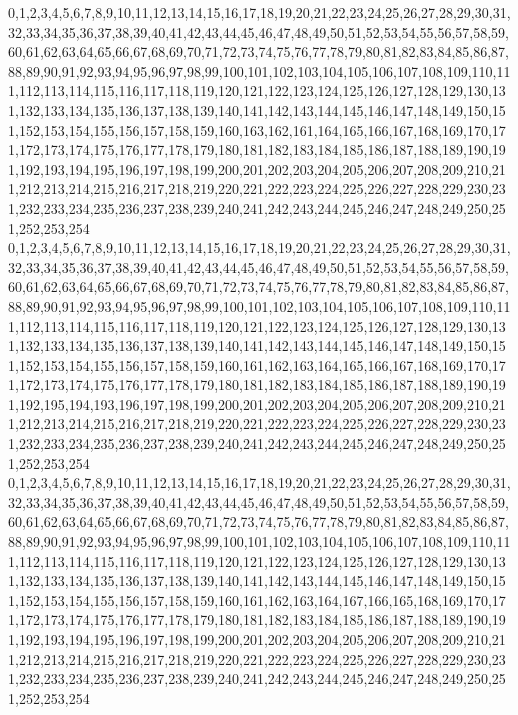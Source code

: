 \documentclass[12pt]{article}
\begin{document}
{0,1,2,3,4,5,6,7,8,9,10,11,12,13,14,15,16,17,18,19,20,21,22,23,24,25,26,27,28,29,30,31,32,33,34,35,36,37,38,39,40,41,42,43,44,45,46,47,48,49,50,51,52,53,54,55,56,57,58,59,60,61,62,63,64,65,66,67,68,69,70,71,72,73,74,75,76,77,78,79,80,81,82,83,84,85,86,87,88,89,90,91,92,93,94,95,96,97,98,99,100,101,102,103,104,105,106,107,108,109,110,111,112,113,114,115,116,117,118,119,120,121,122,123,124,125,126,127,128,129,130,131,132,133,134,135,136,137,138,139,140,141,142,143,144,145,146,147,148,149,150,151,152,153,154,155,156,157,158,159,160,163,162,161,164,165,166,167,168,169,170,171,172,173,174,175,176,177,178,179,180,181,182,183,184,185,186,187,188,189,190,191,192,193,194,195,196,197,198,199,200,201,202,203,204,205,206,207,208,209,210,211,212,213,214,215,216,217,218,219,220,221,222,223,224,225,226,227,228,229,230,231,232,233,234,235,236,237,238,239,240,241,242,243,244,245,246,247,248,249,250,251,252,253,254\\
0,1,2,3,4,5,6,7,8,9,10,11,12,13,14,15,16,17,18,19,20,21,22,23,24,25,26,27,28,29,30,31,32,33,34,35,36,37,38,39,40,41,42,43,44,45,46,47,48,49,50,51,52,53,54,55,56,57,58,59,60,61,62,63,64,65,66,67,68,69,70,71,72,73,74,75,76,77,78,79,80,81,82,83,84,85,86,87,88,89,90,91,92,93,94,95,96,97,98,99,100,101,102,103,104,105,106,107,108,109,110,111,112,113,114,115,116,117,118,119,120,121,122,123,124,125,126,127,128,129,130,131,132,133,134,135,136,137,138,139,140,141,142,143,144,145,146,147,148,149,150,151,152,153,154,155,156,157,158,159,160,161,162,163,164,165,166,167,168,169,170,171,172,173,174,175,176,177,178,179,180,181,182,183,184,185,186,187,188,189,190,191,192,195,194,193,196,197,198,199,200,201,202,203,204,205,206,207,208,209,210,211,212,213,214,215,216,217,218,219,220,221,222,223,224,225,226,227,228,229,230,231,232,233,234,235,236,237,238,239,240,241,242,243,244,245,246,247,248,249,250,251,252,253,254\\
0,1,2,3,4,5,6,7,8,9,10,11,12,13,14,15,16,17,18,19,20,21,22,23,24,25,26,27,28,29,30,31,32,33,34,35,36,37,38,39,40,41,42,43,44,45,46,47,48,49,50,51,52,53,54,55,56,57,58,59,60,61,62,63,64,65,66,67,68,69,70,71,72,73,74,75,76,77,78,79,80,81,82,83,84,85,86,87,88,89,90,91,92,93,94,95,96,97,98,99,100,101,102,103,104,105,106,107,108,109,110,111,112,113,114,115,116,117,118,119,120,121,122,123,124,125,126,127,128,129,130,131,132,133,134,135,136,137,138,139,140,141,142,143,144,145,146,147,148,149,150,151,152,153,154,155,156,157,158,159,160,161,162,163,164,167,166,165,168,169,170,171,172,173,174,175,176,177,178,179,180,181,182,183,184,185,186,187,188,189,190,191,192,193,194,195,196,197,198,199,200,201,202,203,204,205,206,207,208,209,210,211,212,213,214,215,216,217,218,219,220,221,222,223,224,225,226,227,228,229,230,231,232,233,234,235,236,237,238,239,240,241,242,243,244,245,246,247,248,249,250,251,252,253,254\\
}
\end{document}
